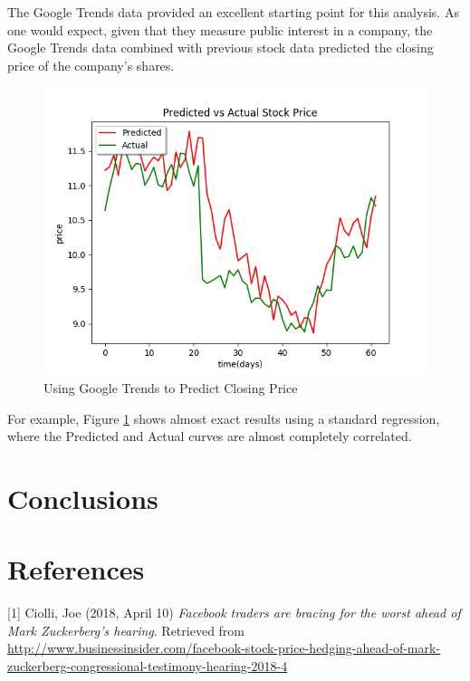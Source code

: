 \documentclass{article}
\begin{document}
The Google Trends data provided an excellent starting point for this analysis. As one would expect, given that they measure public interest in a company, the Google Trends data combined with previous stock data predicted the closing price of the company's shares. 
\begin{figure}[h]
	\centering
    \includegraphics[scale=0.65]{googleHP.png}
  \caption{Using Google Trends to Predict Closing Price}
  \label{fig:googlehp}
\end{figure}

For example, Figure \ref{fig:googlehp} shows almost exact results using a standard regression, where the Predicted and Actual curves are almost completely correlated. 

\section{Conclusions}

\section{References}

\small

[1] Ciolli, Joe (2018, April 10) \emph{Facebook traders are bracing for the worst ahead of Mark Zuckerberg's hearing}. Retrieved from \url{http://www.businessinsider.com/facebook-stock-price-hedging-ahead-of-mark-zuckerberg-congressional-testimony-hearing-2018-4}
\end{document}

